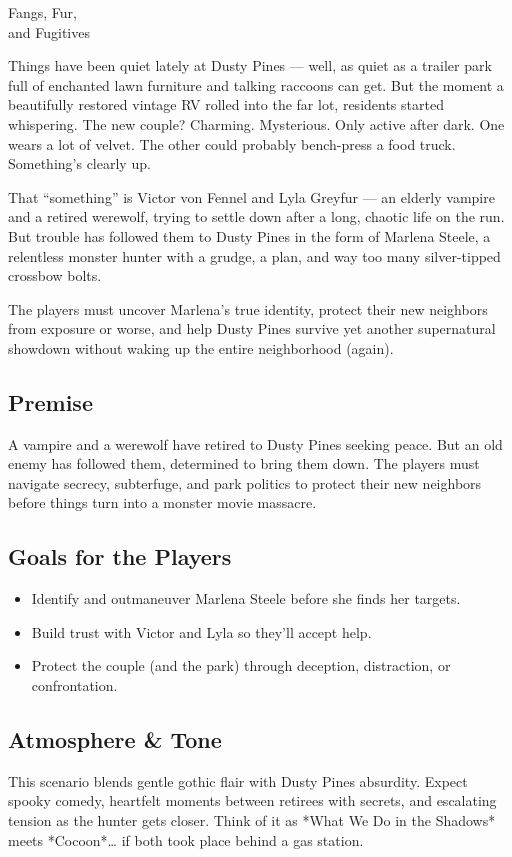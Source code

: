 

\begin{WyrdScenarioHeading}{Fangs, Fur,\\ and Fugitives}
    \label{scenario:fangs-fur-fugitive}

    Things have been quiet lately at Dusty Pines — well, as quiet as a trailer park full of enchanted lawn furniture and talking raccoons can get. But the moment a beautifully restored vintage RV rolled into the far lot, residents started whispering. The new couple? Charming. Mysterious. Only active after dark. One wears a lot of velvet. The other could probably bench-press a food truck. Something’s clearly up.

    That “something” is Victor von Fennel and Lyla Greyfur — an elderly vampire and a retired werewolf, trying to settle down after a long, chaotic life on the run. But trouble has followed them to Dusty Pines in the form of Marlena Steele, a relentless monster hunter with a grudge, a plan, and way too many silver-tipped crossbow bolts.

    The players must uncover Marlena’s true identity, protect their new neighbors from exposure or worse, and help Dusty Pines survive yet another supernatural showdown without waking up the entire neighborhood (again).

    \subsection*{Premise}
    A vampire and a werewolf have retired to Dusty Pines seeking peace. But an old enemy has followed them, determined to bring them down. The players must navigate secrecy, subterfuge, and park politics to protect their new neighbors before things turn into a monster movie massacre.

    \subsection*{Goals for the Players}
    \begin{itemize}
        \item Identify and outmaneuver Marlena Steele before she finds her targets.
        \item Build trust with Victor and Lyla so they’ll accept help.
        \item Protect the couple (and the park) through deception, distraction, or confrontation.
    \end{itemize}

    \subsection*{Atmosphere \& Tone}
    This scenario blends gentle gothic flair with Dusty Pines absurdity. Expect spooky comedy, heartfelt moments between retirees with secrets, and escalating tension as the hunter gets closer. Think of it as *What We Do in the Shadows* meets *Cocoon*… if both took place behind a gas station.
\end{WyrdScenarioHeading}

